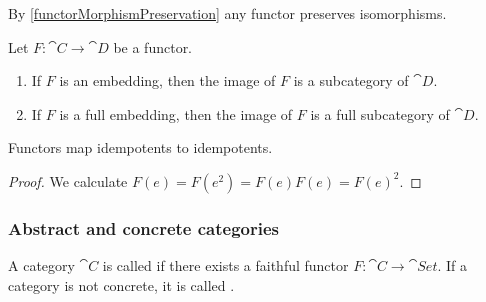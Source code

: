 By \ref{functorMorphismPreservation} any functor preserves isomorphisms.

\begin{proposition}
Let $F:\cat{C}\to\cat{D}$ be a functor.
\begin{enumerate}
\item If $F$ is an embedding, then the image of $F$ is a subcategory of $\cat{D}$.
\item If $F$ is a full embedding, then the image of $F$ is a full subcategory of $\cat{D}$.
\end{enumerate}
\end{proposition}

\begin{lemma}
Functors map idempotents to idempotents.
\end{lemma}
\begin{proof}
We calculate $F(e) = F(e^2) = F(e)F(e) = F(e)^2$.
\end{proof}

\subsubsection{Abstract and concrete categories}
\begin{definition}
A category $\cat{C}$ is called  if there exists a faithful functor $F: \cat{C} \to \cat{Set}$.
If a category is not concrete, it is called .
\end{definition}

